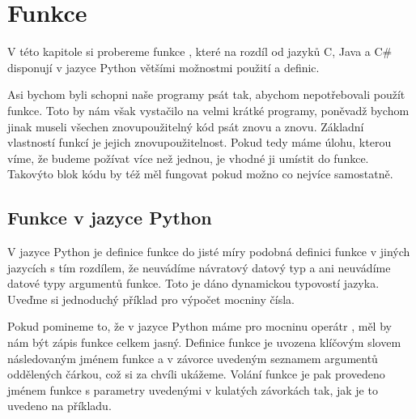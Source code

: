 \chapter{Funkce}%

V této kapitole si probereme funkce%
, které na rozdíl od jazyků C, Java a C\# disponují
v jazyce Python většími možnostmi použití a definic.

Asi bychom byli schopni naše programy psát tak, abychom nepotřebovali použít funkce.
Toto by nám však vystačilo na velmi krátké programy, poněvadž bychom jinak museli všechen
znovupoužitelný kód psát znovu a znovu.
%
Základní vlastností funkcí je jejich znovupoužitelnost. Pokud tedy máme úlohu,
kterou víme, že budeme požívat více než jednou, je vhodné ji umístit do funkce. Takovýto
blok kódu by též měl fungovat pokud možno co nejvíce samostatně. %



\section{Funkce v jazyce Python}

V jazyce Python je definice funkce do jisté míry podobná definici funkce v jiných jazycích s tím rozdílem,
že neuvádíme návratový datový typ a ani neuvádíme datové typy argumentů funkce. Toto je dáno
dynamickou typovostí jazyka. Uveďme si jednoduchý příklad pro výpočet mocniny čísla.


Pokud pomineme to, že v jazyce Python máme pro mocninu operátr \kod{**}, měl by nám být
zápis funkce celkem jasný. Definice funkce je uvozena klíčovým slovem  následovaným
jménem funkce a v závorce uvedeným seznamem argumentů oddělených čárkou, což si za chvíli ukážeme.
Volání funkce je pak provedeno jménem funkce s parametry uvedenými v kulatých závorkách tak,
jak je to uvedeno na příkladu.

